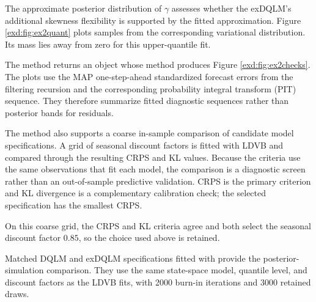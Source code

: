 The approximate posterior distribution of $\gamma$ assesses whether the
exDQLM's additional skewness flexibility is supported by the fitted
approximation. Figure \ref{exd:fig:ex2quant} plots samples from the
corresponding variational distribution. Its mass lies away from zero for this
upper-quantile fit.



The  method returns an  object whose
 method produces Figure \ref{exd:fig:ex2checks}. The plots use
the MAP one-step-ahead standardized forecast errors from the filtering
recursion and the corresponding probability integral transform (PIT)
sequence. They therefore summarize fitted diagnostic sequences rather than
posterior bands for residuals.



The  method also supports a coarse in-sample comparison of
candidate model specifications. A grid of seasonal discount factors is fitted
with LDVB and compared through the resulting CRPS and KL values. Because the
criteria use the same observations that fit each model, the comparison is a
diagnostic screen rather than an out-of-sample predictive validation. CRPS is
the primary criterion and KL divergence is a complementary calibration check;
the selected specification has the smallest CRPS.


On this coarse grid, the CRPS and KL criteria agree and both select the seasonal discount factor \(0.85\), so the choice used above is retained.

Matched DQLM and exDQLM specifications fitted with  provide
the posterior-simulation comparison. They use the same state-space model,
quantile level, and discount factors as the LDVB fits, with 2000 burn-in
iterations and 3000 retained draws.



